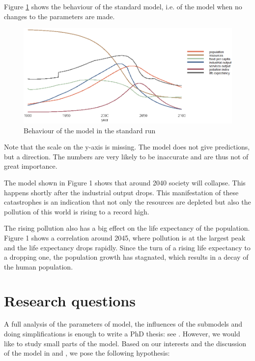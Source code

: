 \documentclass[10pt,a4paper]{scrartcl}
\begin{document}
Figure \ref{standard-run} shows the behaviour of the standard model, i.e. of the model when no changes to the parameters are made.

\begin{figure}
\centering
\includegraphics[width=\textwidth]{./plaatjes/standard-run.png}
\caption{Behaviour of the model in the standard run}
\label{standard-run}
\end{figure}

Note that the scale on the y-axis is missing. The model does not give predictions, but a direction. The numbers are very likely to be inaccurate and are thus not of great importance.

The model shown in Figure 1 shows that around 2040 society will collapse. This happens shortly after the industrial output drops. This manifestation of these catastrophes is an indication that not only the resources are depleted but also the pollution of this world is rising to a record high.

The rising pollution also has a big effect on the life expectancy of the population. Figure 1 shows a correlation around 2045, where pollution is at the largest peak and the life expectancy drops rapidly. Since the turn of a rising life expectancy to a dropping one, the population growth has stagnated, which results in a decay of the human population.

\section*{Research questions}

A full analysis of the parameters of model, the influences of the submodels and doing simplifications is enough to write a PhD thesis: see \cite{thissen1978investigations}. However, we would like to study small parts of the model. Based on our interests and the discussion of the model in \cite{thissen1978investigations} and \cite{vermeulen1976parameter}, we pose the following hypothesis:
\end{document}
